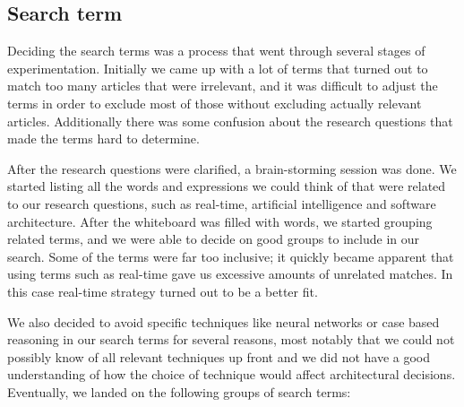 \subsection{Search term}
\label{sub:search_term}

Deciding the search terms was a process that went through several stages of experimentation. Initially we came up with a lot of terms that turned out to match too many articles that were irrelevant, and it was difficult to adjust the terms in order to exclude most of those without excluding actually relevant articles. Additionally there was some confusion about the research questions that made the terms hard to determine.

After the research questions were clarified, a brain-storming session was done. We started listing all the words and expressions we could think of that were related to our research questions, such as real-time, artificial intelligence and software architecture. After the whiteboard was filled with words, we started grouping related terms, and we were able to decide on good groups to include in our search. Some of the terms were far too inclusive; it quickly became apparent that using terms such as real-time gave us excessive amounts of unrelated matches. In this case real-time strategy turned out to be a better fit.

We also decided to avoid specific techniques like neural networks or case based reasoning in our search terms for several reasons, most notably that we could not possibly know of all relevant techniques up front and we did not have a good understanding of how the choice of technique would affect architectural decisions. Eventually, we landed on the following groups of search terms:

